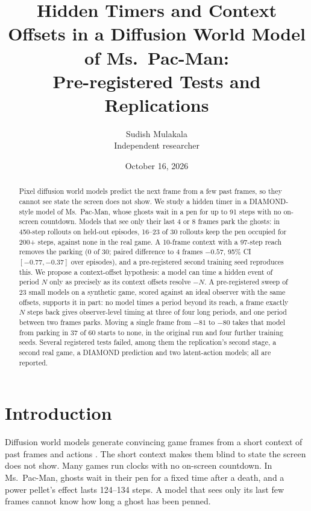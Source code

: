 \documentclass[11pt]{article}
\title{Hidden Timers and Context Offsets in a Diffusion World Model of Ms.~Pac-Man:\\
Pre-registered Tests and Replications}
\author{Sudish Mulakala\\Independent researcher}
\date{October 16, 2026}
\begin{document}
\maketitle

\begin{abstract}
Pixel diffusion world models predict the next frame from a few past frames, so they cannot see state the screen
does not show. We study a hidden timer in a DIAMOND-style model of Ms.~Pac-Man, whose ghosts wait in a pen for up
to 91 steps with no on-screen countdown. Models that see only their last 4 or 8 frames park the ghosts: in 450-step
rollouts on held-out episodes, 16--23 of 30 rollouts keep the pen occupied for 200+ steps, against none in the real
game. A 10-frame context with a 97-step reach removes the parking (0 of 30; paired difference to 4 frames $-0.57$,
95\% CI $[-0.77,-0.37]$ over episodes), and a pre-registered second training seed reproduces this. We propose a
context-offset hypothesis: a model can time a hidden event of period $N$ only as precisely as its context offsets
resolve $-N$. A
pre-registered sweep of 23 small models on a synthetic game, scored against an ideal observer with the same
offsets, supports it in part: no model times a period beyond its reach, a frame exactly $N$ steps back gives
observer-level timing at three of four long periods, and one period between two frames parks. Moving a single frame
from $-81$ to $-80$ takes that model from parking in 37 of 60 starts to none, in the original run and four further
training seeds. Several registered tests failed, among them the replication's second stage, a second real game, a
DIAMOND prediction and two latent-action models; all are reported.
\end{abstract}

\section{Introduction}
Diffusion world models generate convincing game frames from a short context of past frames and actions
\cite{alonso2024diamond,valevski2024gamengen}. The short context makes them blind to state the screen does not show.
Many games run clocks with no on-screen countdown. In Ms.~Pac-Man, ghosts wait in their pen for a fixed time after a
death, and a power pellet's effect lasts 124--134 steps. A model that sees only its last few frames cannot know how
long a ghost has been penned.
\end{document}
